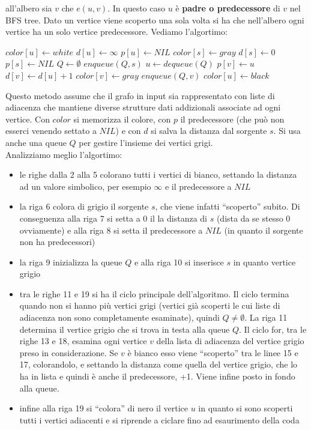 \documentclass[a4paper,12pt, oneside]{book}
\begin{document}
all'albero sia $v$ che $e(u,v)$. In questo caso $u$ è \textbf{padre o
  predecessore} di $v$ nel BFS tree. Dato un vertice viene scoperto
una sola volta si ha che nell'albero ogni vertice ha un solo vertice
predecessore. 
\newpage
Vediamo l'algortimo:
\begin{algorithm}[H]
  \begin{algorithmic}[1]
    \State $color[u]\gets white$
    \State $d[u]\gets \infty$
    \State $p[u]\gets NIL$
    \EndFor
    \State $color[s]\gets gray$
    \State $d[s]\gets 0$
    \State $p[s]\gets NIL$
    \State $Q\gets \emptyset$
    \State $enqueue(Q,s)$
    \State $u\gets dequeue(Q)$
    \State $p[v]\gets u$
    \State $d[v]\gets d[u]+1$
    \State $color[v]\gets gray$
    \State $enqueue(Q,v)$
    \EndIf
    \EndFor
    \State $color[u]\gets black$ 
    \EndWhile
    \EndFunction
  \end{algorithmic}
\end{algorithm}
Questo metodo assume che il grafo in input sia rappresentato con liste
di adiacenza che mantiene diverse strutture dati addizionali associate
ad ogni vertice. Con $color$ si memorizza il colore, con $p$ il
predecessore (che può non esserci venendo settato a $NIL$) e con $d$
si salva la distanza dal sorgente $s$. Si usa anche una queue $Q$ per
gestire l'insieme dei vertici grigi.\\
Analizziamo meglio l'algortimo:
\begin{itemize}
  \item le righe dalla 2 alla 5 colorano tutti i vertici di bianco,
  settando la distanza ad un valore simbolico, per esempio $\infty$ e
  il predecessore a $NIL$
  \item la riga 6 colora di grigio il sorgente $s$, che viene infatti
  ``scoperto'' subito. Di conseguenza alla riga 7 si setta a 0 il
  la distanza di $s$ (dista da se stesso 0 ovviamente) e alla riga 8
  si setta il predecessore a $NIL$ (in quanto il sorgente non ha
  predecessori)
  \item la riga 9 inizializza la queue $Q$ e alla riga 10 si inserisce
  $s$ in quanto vertice grigio
  \item tra le righe 11 e 19 si ha il ciclo principale
  dell'algoritmo. Il ciclo termina quando non si hanno più vertici
  grigi (vertici già scoperti le cui liste di adiacenza non sono
  completamente esaminate), quindi $Q\neq \emptyset$. La riga 11
  determina il vertice grigio che   si trova in testa alla queue
  $Q$. Il ciclo for, tra le righe 13 e   18, esamina ogni vertice $v$
  della lista di adiacenza del vertice grigio   preso in
  considerazione. Se $v$ è bianco esso viene ``scoperto'' tra   le
  linee 15 e 17, colorandolo, e settando la distanza come quella   del
  vertice grigio, che lo ha in lista e quindi è anche il
  predecessore, +1. Viene infine posto in fondo alla queue.
  \item infine alla riga 19 si ``colora'' di nero il vertice $u$ in
  quanto si sono scoperti tutti i vertici adiacenti e si
  riprende a ciclare fino ad esaurimento della coda
\end{itemize}
\end{document}
